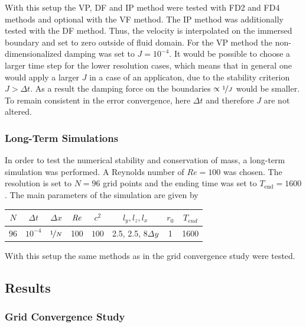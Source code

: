 With this setup the VP, DF and IP method were tested with FD2 and FD4 methods and optional with the VF method.
The IP method was additionally tested with the DF method. Thus, the velocity is interpolated on the
immersed boundary and set to zero outside of fluid domain.
For the VP method the non-dimensionalized damping was set to $J=10^{-4}$.
It would be possible to choose a larger time step for the lower resolution cases, which means that in general
one would apply a larger $J$ in a case of an applicaton, due to the stability criterion $J>\Delta t$.
As a result the damping force on the boundaries $\propto \nicefrac{1}{J}$ would be smaller.
To remain consistent in the error convergence, here $\Delta t$ and
therefore $J$ are not altered.

\subsubsection{Long-Term Simulations}

In order to test the  numerical stability and conservation of mass, a long-term simulation was performed.
A Reynolds number of $Re=100$ was chosen. The resolution is set to $N=96$ grid points and
the ending time was set to $T_{\text{end}}=1600$.
The main parameters of the simulation are  given by

\begin{center}
\vspace*{0.7ex}
\begin{tabular}{c|c|c|c|c|c|c|c }
 $ N  $                   & $\Delta t$ & $\Delta x$            & $\mbox{\textit{Re}}$  & $c^2$   & $l_y, l_z, l_x $ &$r_0$ & $T_{end}$\\
\hline
 $96 $& $10^{-4}$ & $\nicefrac{1}{N}$ & 100     & $100$   & 2.5, 2.5, $8\Delta y $ & 1     & 1600\\
\end{tabular}
\vspace*{0.7ex}
\end{center}

With this setup the same methods as in the grid convergence study were tested.

\subsection{Results}

\subsubsection{Grid Convergence Study}

